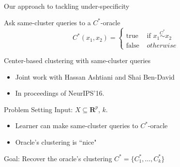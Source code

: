 \documentclass{beamer}
\newcommand{\mb}{\mathbf}
\begin{document}
\begin{frame}{Our approach to tackling under-specificity}
	

    \vspace{20pt}Ask {\color{blue}same-cluster queries} to a $C^*$-oracle\\
    $$C^*(x_1, x_2) = \left\{
	\begin{array}{ll}
		\mbox{true }  & \mbox{if } x_1 \overset{C^*}{\sim} x_2   \\
		\mbox{false } & otherwise 
	\end{array}
\right. $$
\end{frame}

\begin{frame}{Center-based clustering with same-cluster queries}
	\begin{itemize}
		\item Joint work with Hassan Ashtiani and Shai Ben-David
		\vspace{20pt} \item In proceedings of \alert{NeurIPS'16}.
	\end{itemize}
\end{frame}

\begin{frame}{Problem Setting}
	Input: $X \subseteq \mb R^p$, $k$.
	\begin{itemize} 
   		\vspace{10pt}\item Learner can make same-cluster queries to $C^*$-oracle
		\vspace{10pt}\item Oracle's clustering is ``nice"
	\end{itemize}
	\vspace{30pt} {\color{blue}Goal}: Recover the oracle's clustering $C^* = \{C_1^*, \ldots, C_k^*\}$
\end{frame}
\end{document}
